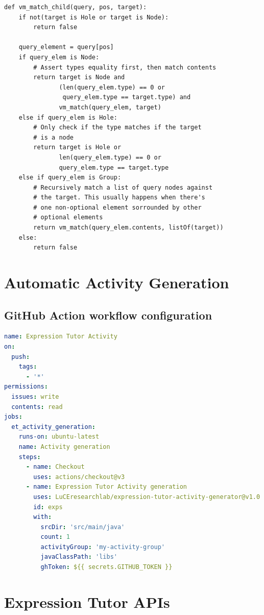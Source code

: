 \begin{lstlisting}[caption={Pseudo–code implementation of
                            the query–matching algorithm.},
                   label={lst:etl-query-algo},
                   language=pseudocode]
def vm_match_child(query, pos, target):
    if not(target is Hole or target is Node):
        return false

    query_element = query[pos]
    if query_elem is Node:
        # Assert types equality first, then match contents
        return target is Node and
               (len(query_elem.type) == 0 or
                query_elem.type == target.type) and
               vm_match(query_elem, target)
    else if query_elem is Hole:
        # Only check if the type matches if the target
        # is a node
        return target is Hole or
               len(query_elem.type) == 0 or
               query_elem.type == target.type
    else if query_elem is Group:
        # Recursively match a list of query nodes against
        # the target. This usually happens when there's
        # one non-optional element sorrounded by other
        # optional elements
        return vm_match(query_elem.contents, listOf(target))
    else:
        return false
\end{lstlisting}


\chapter{Automatic Activity Generation}

\section{GitHub Action workflow configuration}

\begin{lstlisting}[language=yaml,
                   caption={Example GitHub Workflow configuration.},
                   label={lst:impl-gi-workflow}]
name: Expression Tutor Activity
on:
  push:
    tags:
      - '*'
permissions:
  issues: write
  contents: read
jobs:
  et_activity_generation:
    runs-on: ubuntu-latest
    name: Activity generation
    steps:
      - name: Checkout
        uses: actions/checkout@v3
      - name: Expression Tutor Activity generation
        uses: LuCEresearchlab/expression-tutor-activity-generator@v1.0.0
        id: exps
        with:
          srcDir: 'src/main/java'
          count: 1
          activityGroup: 'my-activity-group'
          javaClassPath: 'libs'
          ghToken: ${{ secrets.GITHUB_TOKEN }}
\end{lstlisting}

\chapter{Expression Tutor APIs}

